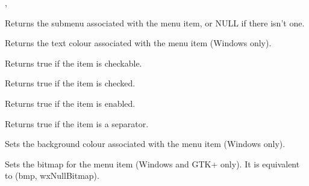 
, 

\label{wxmenuitemgetsubmenu}


Returns the submenu associated with the menu item, or NULL if there isn't one.

\label{wxmenuitemgettextcolour}


Returns the text colour associated with the menu item (Windows only).

\label{wxmenuitemischeckable}


Returns true if the item is checkable.

\label{wxmenuitemischecked}


Returns true if the item is checked.

\label{wxmenuitemisenabled}


Returns true if the item is enabled.

\label{wxmenuitemisseparator}


Returns true if the item is a separator.

\label{wxmenuitemsetbackgroundcolour}


Sets the background colour associated with the menu item (Windows only).

\label{wxmenuitemsetbitmap}


Sets the bitmap for the menu item (Windows and GTK+ only). It is
equivalent to (bmp, wxNullBitmap).

